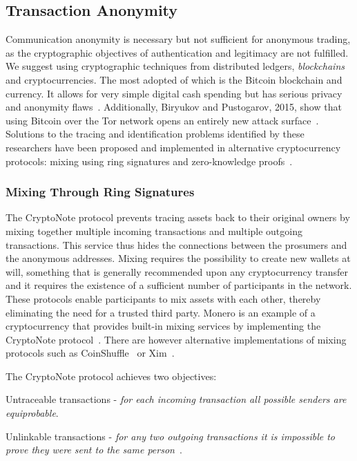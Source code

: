 \subsection{Transaction Anonymity}
\label{trans}
Communication anonymity is necessary but not sufficient for
anonymous trading, as the cryptographic objectives of authentication and legitimacy are not fulfilled. We suggest using cryptographic techniques from distributed ledgers, \textit{blockchains} and cryptocurrencies. The most adopted of which is the Bitcoin blockchain and currency. It allows for very simple digital cash spending but has serious privacy and anonymity flaws~\cite{Barber2012,Reid2013,apostolaki2017}. Additionally, Biryukov and Pustogarov, 2015, show that using Bitcoin over the Tor network opens an entirely new attack surface~\cite{biryukov2015}. Solutions to the tracing and identification problems identified by these researchers have been proposed and implemented in alternative cryptocurrency protocols: mixing using ring signatures and zero-knowledge proofs~\cite{miers2013zerocoin,cryptonote}. 

\subsubsection{Mixing Through Ring Signatures}
The CryptoNote protocol prevents tracing assets back to their original owners by
mixing together multiple incoming transactions and multiple outgoing
transactions. This service thus hides the connections between the
prosumers and the anonymous addresses. Mixing requires the possibility to create new wallets at will, something that is generally recommended upon any cryptocurrency transfer and it requires the existence of a sufficient number of participants in the network. These protocols enable participants to
mix assets with each other, thereby eliminating the need for a trusted
third party. Monero is an example of a cryptocurrency that provides built-in mixing services by implementing the CryptoNote protocol~\cite{cryptoeprint:2015:1098}. There are however alternative implementations of mixing protocols such as CoinShuffle~\cite{ruffing2014coinshuffle} or
Xim~\cite{bissias2014sybil}.

The CryptoNote protocol achieves two objectives:  
\begin{compactenum}
\item Untraceable transactions - \textit{for each incoming transaction all possible senders are equiprobable}. 
\item Unlinkable transactions - \textit{for any two outgoing transactions it is impossible to prove they were
sent to the same person}~\cite{cryptonote}.
\end{compactenum}

